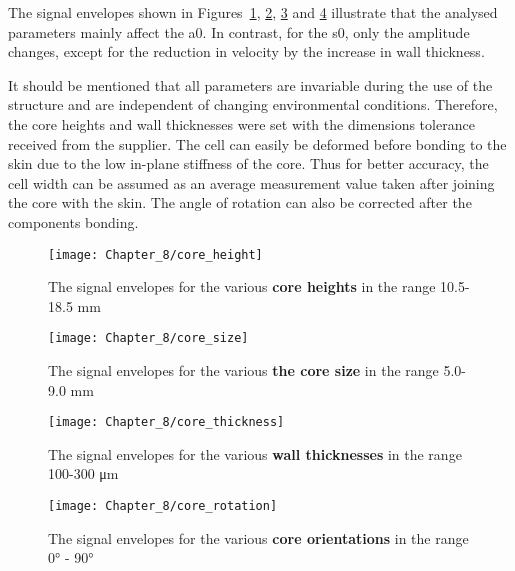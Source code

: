 The signal envelopes shown in Figures~\ref{fig:core_height}, \ref{fig:core_size}, \ref{fig:core_thickness} and \ref{fig:core_rotation} illustrate that the analysed parameters mainly affect the \ac{a0}.
In contrast, for the \ac{s0}, only the amplitude changes, except for the reduction in velocity by the increase in wall thickness.

It should be mentioned that all parameters are invariable during the use of the structure and are independent of changing environmental conditions.
Therefore, the core heights and wall thicknesses were set with the dimensions tolerance received from the supplier.
The cell can easily be deformed before bonding to the skin due to the low in-plane stiffness of the core.
Thus for better accuracy, the cell width can be assumed as an average measurement value taken after joining the core with the skin.
The angle of rotation can also be corrected after the components bonding.
\begin{figure}[!htb]
	\begin{center}
		\texttt{[image: Chapter\_8/core\_height]}
	\end{center}
	\caption{The signal envelopes for the various \textbf{core heights} in the range 10.5-18.5 \unit{\mm}}
	\label{fig:core_height}
\end{figure}

\begin{figure}[!htb]
	\begin{center}
		\texttt{[image: Chapter\_8/core\_size]}
	\end{center}
	\caption{The signal envelopes for the various \textbf{the core size} in the range 5.0-9.0 \unit{\mm}}
	\label{fig:core_size}
\end{figure}

\begin{figure}[!htb]
	\begin{center}
		\texttt{[image: Chapter\_8/core\_thickness]}
	\end{center}
	\caption{The signal envelopes for the various \textbf{wall thicknesses} in the range 100-300 \unit{\micro\m}}
	\label{fig:core_thickness}
\end{figure}

\begin{figure}[!htb]
	\begin{center}
		\texttt{[image: Chapter\_8/core\_rotation]}
	\end{center}
	\caption{The signal envelopes for the various \textbf{core orientations} in the range \ang{0} - \ang{90}}
	\label{fig:core_rotation}
\end{figure}

